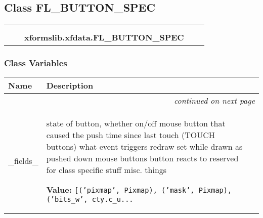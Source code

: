 
\subsection{Class FL\_BUTTON\_SPEC}

    \label{xformslib:xfdata:FL_BUTTON_SPEC}
\begin{tabular}{cccccc}
\multicolumn{2}{r}{\settowidth{\BCL}{ctypes.Structure}\multirow{2}{\BCL}{ctypes.Structure}}
&&
  \\\cline{3-3}
  &&\multicolumn{1}{c|}{}
&&
  \\
&&\multicolumn{2}{l}{\textbf{xformslib.xfdata.FL\_BUTTON\_SPEC}}
\end{tabular}



  \subsubsection{Class Variables}

    \vspace{-1cm}
\hspace{\varindent}\begin{longtable}{|p{\varnamewidth}|p{\vardescrwidth}|l}
\cline{1-2}
\cline{1-2} \centering \textbf{Name} & \centering \textbf{Description}& \\
\cline{1-2}
\endhead\cline{1-2}\multicolumn{3}{r}{\small\textit{continued on next page}}\\\endfoot\cline{1-2}
\endlastfoot\raggedright \_\-f\-i\-e\-l\-d\-s\-\_\- & \raggedright state of button, whether on/off
mouse button that caused the push
time since last touch (TOUCH buttons)
what event triggers redraw
set while drawn as pushed down
mouse buttons button reacts to
reserved for class specific stuff
misc. things

\textbf{Value:} 
{\tt [('pixmap', Pixmap), ('mask', Pixmap), ('bits\_w', cty.c\_u\texttt{...}}&\\
\cline{1-2}
\end{longtable}

